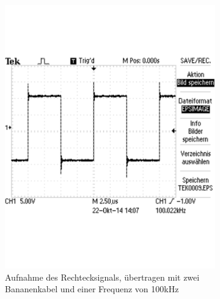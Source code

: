 \documentclass[12pt,a4paper]{article}
\begin{document}
\begin{figure}[H]
        \centering
        \begin{subfigure}[b]{0.48\textwidth}
                \includegraphics[width=\textwidth , scale = 0.4]{2_3_vgl_2.pdf}
				\caption[Aufnahme des Rechtecksignals, übertragen mit zwei Bananenkabel und einer Frequenz von 100kHz]{Aufnahme des Rechtecksignals, übertragen mit zwei Bananenkabel und einer Frequenz von 100kHz}
 				\label{fig:2_3_vgl_2}
        \end{subfigure}%
        ~ %
        \hfill
        \begin{subfigure}[b]{0.48\textwidth}

\end{subfigure}
\end{figure}
\end{document}
